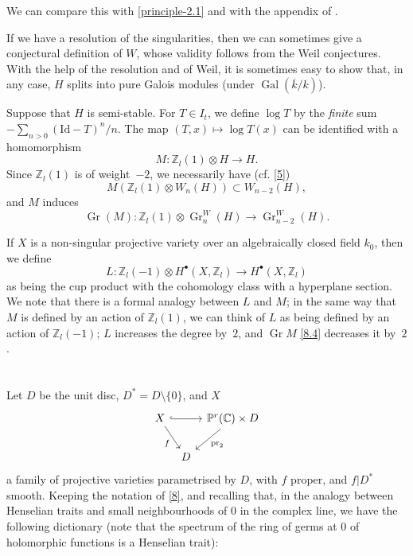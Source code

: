 \documentclass{article}
\theoremstyle{plain}
\theoremstyle{definition}
\newenvironment{env}[1]
    {\renewcommand\theinnercustomenv{#1}\innercustomenv}
    {\endinnercustomenv}
\newcommand{\ZZ}{\mathbb{Z}}
\newcommand{\CC}{\mathbb{C}}
\newcommand{\PP}{\mathbb{P}}
\newcommand{\Id}{\mathrm{Id}}
\DeclareMathOperator{\Gr}{Gr}
\DeclareMathOperator{\Gal}{Gal}
\newcommand{\oldpage}[1]{\marginpar{\footnotesize$\Big\vert$ \textit{p.~#1}}}
\begin{document}
We can compare this with \cref{principle-2.1} and with the appendix of \cite{4}.

If we have a resolution of the singularities, then we can sometimes give a conjectural definition of $W$, whose validity follows from the Weil conjectures.
With the help of the resolution and of Weil, it is sometimes easy to show that, in any case, $H$ splits into pure Galois modules (under $\Gal(\overline{k}/k)$).

Suppose that $H$ is semi-stable.
For $T\in I_t$, we define $\log T$ by the \emph{finite} sum $-\sum_{n>0}(\Id-T)^n/n$.
The map $(T,x)\mapsto\log T(x)$ can be identified with a homomorphism
\[
\label{8.2}
  M\colon \ZZ_l(1)\otimes H \to H.
\tag{8.2}
\]
Since $\ZZ_l(1)$ is of weight~$-2$, we necessarily have (cf. \cref{5})
\[
\label{8.3}
  M(\ZZ_l(1)\otimes W_n(H)) \subset W_{n-2}(H),
\tag{8.3}
\]
and $M$ induces
\[
\label{8.4}
  \Gr(M)\colon \ZZ_l(1)\otimes\Gr_n^W(H) \to \Gr_{n-2}^W(H).
\tag{8.4}
\]

\oldpage{429}
\begin{env}{8.5}
\label{8.5}
  If $X$ is a non-singular projective variety over an algebraically closed field $k_0$, then we define
  \[
    L\colon \ZZ_l(-1)\otimes H^\bullet(X,\ZZ_l) \to H^\bullet(X,\ZZ_l)
  \]
  as being the cup product with the cohomology class with a hyperplane section.
  We note that there is a formal analogy between $L$ and $M$;
  in the same way that $M$ is defined by an action of $\ZZ_l(1)$, we can think of $L$ as being defined by an action of $\ZZ_l(-1)$;
  $L$ increases the degree by~$2$, and $\Gr M$ \cref{8.4} decreases it by~$2$.
\end{env}


\section{}
\label{9}

Let $D$ be the unit disc, $D^*=D\setminus\{0\}$, and $X$
\[
  \begin{tikzcd}[column sep=tiny]
    X \ar[rr,hook] \ar[dr,swap,"f"]
    && \PP^r(\CC)\times D \ar[dl,"\mathrm{pr}_2"]
  \\&D&
  \end{tikzcd}
\]
a family of projective varieties parametrised by $D$, with $f$ proper, and $f|D^*$ smooth.
Keeping the notation of \cref{8}, and recalling that, in the analogy between Henselian traits and small neighbourhoods of $0$ in the complex line, we have the following dictionary (note that the spectrum of the ring of germs at $0$ of holomorphic functions is a Henselian trait):
\end{document}
